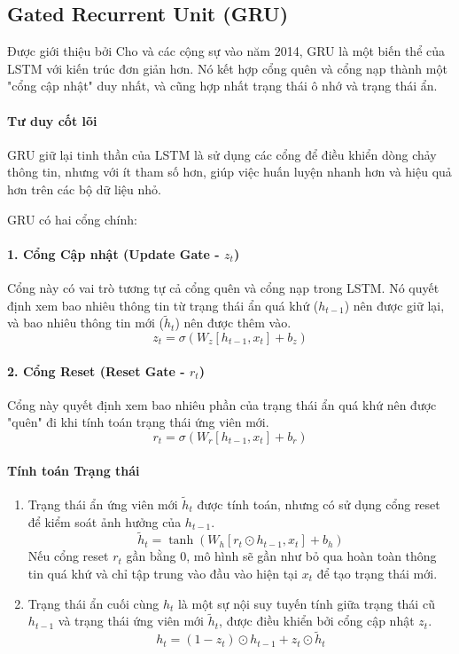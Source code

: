 \subsection{Gated Recurrent Unit (GRU)}
\label{ssec:gru}
Được giới thiệu bởi Cho và các cộng sự vào năm 2014, GRU \cite{cho2014learning} là một biến thể của LSTM với kiến trúc đơn giản hơn. Nó kết hợp cổng quên và cổng nạp thành một "cổng cập nhật" duy nhất, và cũng hợp nhất trạng thái ô nhớ và trạng thái ẩn.

\paragraph{Tư duy cốt lõi}
GRU giữ lại tinh thần của LSTM là sử dụng các cổng để điều khiển dòng chảy thông tin, nhưng với ít tham số hơn, giúp việc huấn luyện nhanh hơn và hiệu quả hơn trên các bộ dữ liệu nhỏ.

GRU có hai cổng chính:
\paragraph{1. Cổng Cập nhật (Update Gate - $z_t$)}
Cổng này có vai trò tương tự cả cổng quên và cổng nạp trong LSTM. Nó quyết định xem bao nhiêu thông tin từ trạng thái ẩn quá khứ ($h_{t-1}$) nên được giữ lại, và bao nhiêu thông tin mới ($\tilde{h}_t$) nên được thêm vào.
$$ z_t = \sigma(W_z [h_{t-1}, x_t] + b_z) $$

\paragraph{2. Cổng Reset (Reset Gate - $r_t$)}
Cổng này quyết định xem bao nhiêu phần của trạng thái ẩn quá khứ nên được "quên" đi khi tính toán trạng thái ứng viên mới.
$$ r_t = \sigma(W_r [h_{t-1}, x_t] + b_r) $$

\paragraph{Tính toán Trạng thái}
\begin{enumerate}
    \item Trạng thái ẩn ứng viên mới $\tilde{h}_t$ được tính toán, nhưng có sử dụng cổng reset để kiểm soát ảnh hưởng của $h_{t-1}$.
        $$ \tilde{h}_t = \tanh(W_h [r_t \odot h_{t-1}, x_t] + b_h) $$
        Nếu cổng reset $r_t$ gần bằng 0, mô hình sẽ gần như bỏ qua hoàn toàn thông tin quá khứ và chỉ tập trung vào đầu vào hiện tại $x_t$ để tạo trạng thái mới.
    \item Trạng thái ẩn cuối cùng $h_t$ là một sự nội suy tuyến tính giữa trạng thái cũ $h_{t-1}$ và trạng thái ứng viên mới $\tilde{h}_t$, được điều khiển bởi cổng cập nhật $z_t$.
        $$ h_t = (1 - z_t) \odot h_{t-1} + z_t \odot \tilde{h}_t $$
\end{enumerate}

